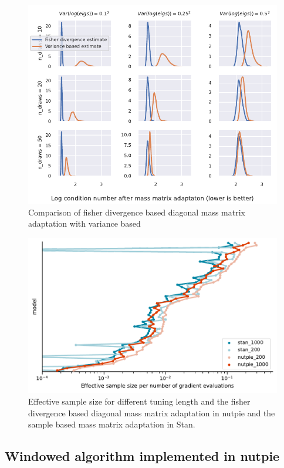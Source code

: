 \documentclass{scrartcl}
\begin{document}
\begin{figure}
\includegraphics{figures/diag_condition_number}
\caption {Comparison of fisher divergence based diagonal mass matrix adaptation with variance based}
\label{fig_diag_condition}
\end{figure}


\begin{figure}
\includegraphics{figures/ess_per_grad}
\caption{
    Effective sample size for different tuning length and the fisher divergence
    based diagonal mass matrix adaptation in nutpie and the sample based
    mass matrix adaptation in Stan.
}
\label{fig_diag_condition}
\end{figure}


\subsection{Windowed algorithm implemented in nutpie}
\end{document}
